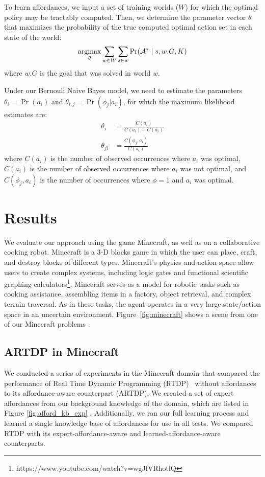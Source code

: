 \documentclass[conference]{IEEEtran}
\newcommand{\dnote}[1]{\textcolor{Green}{\textbf{}}}
\newcommand{\enote}[1]{\textcolor{Red}{\textbf{}}}
\newcommand{\argmax}{\operatornamewithlimits{argmax}} %
\begin{document}
To learn affordances, we input a set of training worlds ($W$) for which the optimal policy
may be tractably computed. Then, we determine the parameter vector $\theta$ that 
maximizes the probability of the true computed optimal action set in each state of the world:
\begin{equation}
\argmax_\theta \sum_{w \in W} \sum_{s \in w} \Pr(\mathcal{A}^* \mid s, w.G, K)
\end{equation}
where $w.G$ is the goal that was solved in world $w$.

Under our Bernouli Naive Bayes model, we need to estimate the parameters
$\theta_i = \Pr(a_i)$ and $\theta_{i,j} = \Pr(\phi_j | a_i)$, for which the maximum likelihood estimates are:
\begin{align}
\theta_i &= \frac{C(a_i)}{C(a_i) + C(\bar{a_i})} \\
\theta_{ji} &= \frac{C(\phi_j, a_i)}{C(a_i)}
\end{align}
where $C(a_i)$ is the number of observed occurrences where $a_i$ was optimal,
$C(\bar{a_i})$ is the number of observed occurrences where $a_i$ was not optimal,
and $C(\phi_j, a_i)$ is the number of occurrences where $\phi=1$ and $a_i$ was optimal.

\section{Results}
\label{sec:results}

We evaluate our approach using the game Minecraft, as well as on a
collaborative cooking robot.  Minecraft is a 3-D blocks game in which
the user can place, craft, and destroy blocks of different types.
Minecraft's physics and action space allow users to create complex
systems, including logic gates and functional scientific graphing
calculators\footnote{https://www.youtube.com/watch?v=wgJfVRhotlQ}.
Minecraft serves as a model for robotic tasks such as cooking
assistance, assembling items in a factory, object retrieval, and
complex terrain traversal.  As in these tasks, the agent operates in a
very large state/action space in an uncertain environment.
Figure~\ref{fig:minecraft} shows a scene from one of our Minecraft
problems \enote{This doesn't seem fair to say since it this is much more difficult than our actual tests.}.

\subsection{ARTDP in Minecraft}
We conducted a series of experiments in the Minecraft domain that
compared the performance of Real Time Dynamic Programming (RTDP)~\citep{barto95}
without affordances to its affordance-aware counterpart (ARTDP). We created a set of expert
affordances from our background knowledge of the domain, which are
listed in Figure \ref{fig:afford_kb_exp} \dnote{Expert ignored for now}. Additionally, we ran our full
learning process and learned a single knowledge base of affordances for use in all tests. We compared
RTDP with its expert-affordance-aware and learned-affordance-aware 
counterparts. 
\end{document}
